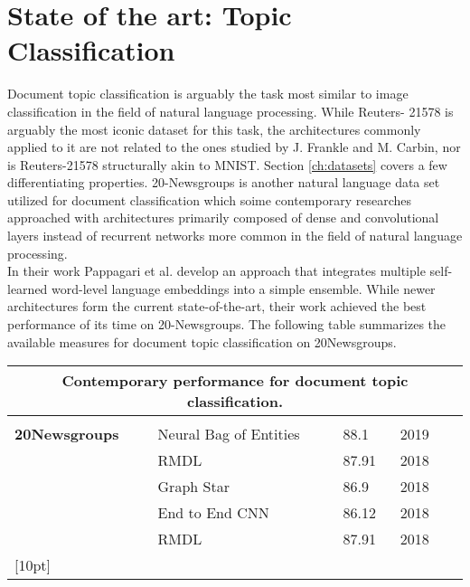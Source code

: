 \section{State of the art: Topic Classification}
Document topic classification is arguably the task most similar to image classification in the field of natural language processing. While Reuters-
21578 is arguably the most iconic dataset for this task, the architectures commonly applied to it are not related to the ones studied by J. Frankle and M. Carbin, nor is Reuters-21578 structurally
akin to MNIST. Section \ref{ch:datasets} covers a few differentiating properties.
20-Newsgroups is another natural language data set utilized for document classification which soime contemporary researches approached with architectures primarily composed of dense and convolutional layers instead of recurrent networks more common in the field of natural language processing.\\
In their work Pappagari et al. develop an approach that integrates multiple self-learned word-level language embeddings into a simple ensemble.\cite{End-to-End-CNN}
While newer architectures form the current state-of-the-art, their work achieved the best performance of its time on 20-Newsgroups. The following table summarizes the available measures for document topic classification on 20Newsgroups.

\begin{tabularx}{\textwidth}{X X X X X}
	\multicolumn{5}{c}{\textbf{Contemporary performance for document topic classification.}}\\
	\hline
	\endhead
	\\
	\textbf{20Newsgroups} & Neural Bag of Entities & 88.1 & 2019 & \cite{Neural-BoE}\\
	& RMDL & 87.91 & 2018 & \cite{RMDL}\\
	& Graph Star & 86.9 & 2018 & \cite{Graph-Star}\\
	& End to End CNN & 86.12 & 2018 & \cite{End-to-End-CNN}\\
	& RMDL & 87.91 & 2018 & \cite{RMDL}\\
	[10pt]
	\hline
\end{tabularx}


